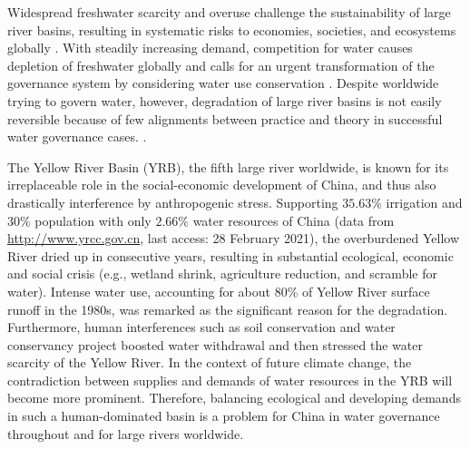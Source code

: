 Widespread freshwater scarcity and overuse challenge the sustainability of large river basins, resulting in systematic risks to economies, societies, and ecosystems globally \cite{distefano2017, dolan2021, xu2020b, mekonnen2016}.
With steadily increasing demand, competition for water causes depletion of freshwater globally and calls for an urgent transformation of the governance system by considering water use conservation \cite{gleick2010, ziolkowska2016, wang2019d}.
Despite worldwide trying to govern water, however, degradation of large river basins is not easily reversible because of few alignments between practice and theory in successful water governance cases.
\cite{giuliani2013, falkenmark2019, jaeger2019}.

The Yellow River Basin (YRB), the fifth large river worldwide, is known for its irreplaceable role in the social-economic development of China, and thus also drastically interference by anthropogenic stress.
Supporting $35.63\%$ irrigation and $30\%$ population with only $2.66\%$ water resources of China (data from \href{http://www.yrcc.gov.cn}{http://www.yrcc.gov.cn}, last access: 28 February 2021), the overburdened Yellow River dried up in consecutive years, resulting in substantial ecological, economic and social crisis (e.g., wetland shrink, agriculture reduction, and scramble for water).
Intense water use, accounting for about $80\%$ of Yellow River surface runoff in the 1980s, was remarked as the significant reason for the degradation.
Furthermore, human interferences such as soil conservation and water conservancy project boosted water withdrawal and then stressed the water scarcity of the Yellow River.
In the context of future climate change, the contradiction between supplies and demands of water resources in the YRB will become more prominent.
Therefore, balancing ecological and developing demands in such a human-dominated basin is a problem for China in water governance throughout and for large rivers worldwide.

